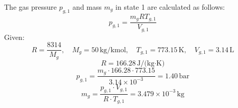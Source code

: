 The gas pressure \( p_{g,1} \) and mass \( m_g \) in state 1 are calculated as follows:  
\[
p_{g,1} = \frac{m_g R T_{g,1}}{V_{g,1}}
\]  
Given:  
\[
R = \frac{8314}{M_g}, \quad M_g = 50 \, \text{kg/kmol}, \quad T_{g,1} = 773.15 \, \text{K}, \quad V_{g,1} = 3.14 \, \text{L}
\]  
\[
R = 166.28 \, \text{J/(kg·K)}
\]  
\[
p_{g,1} = \frac{m_g \cdot 166.28 \cdot 773.15}{3.14 \times 10^{-3}} = 1.40 \, \text{bar}
\]  
\[
m_g = \frac{p_{g,1} \cdot V_{g,1}}{R \cdot T_{g,1}} = 3.479 \times 10^{-3} \, \text{kg}
\]